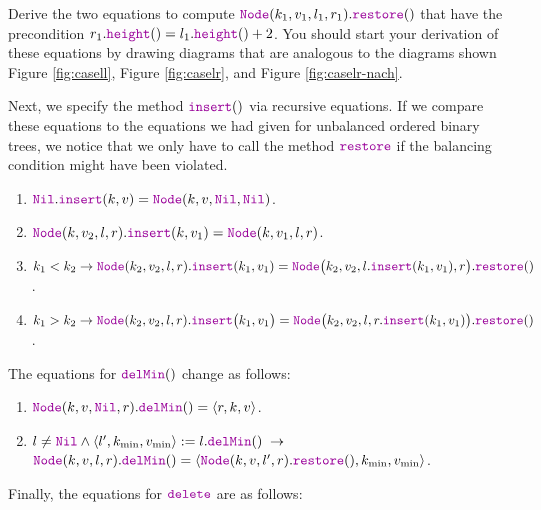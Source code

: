 \exercise
Derive the two equations to compute $\mytt{Node}(k_1,v_1,l_1,r_1).\mytt{restore}()$ that have the
precondition $r_1.\mytt{height}() = l_1.\mytt{height}() + 2$.  You should start your derivation of these
equations by drawing diagrams that are analogous to the diagrams shown Figure \ref{fig:casell}, Figure
\ref{fig:caselr}, and Figure \ref{fig:caselr-nach}. 
\eox

Next, we specify the method  $\mytt{insert}()$ via recursive equations.
If we compare these equations to the equations we had given for unbalanced ordered binary trees, we
notice that we only have to call the method $\mytt{restore}$ if the balancing condition might have
been violated.
\begin{enumerate}
\item $\mytt{Nil}.\mytt{insert}(k,v) = \mytt{Node}(k,v, \mytt{Nil}, \mytt{Nil})$.  
\item $\mytt{Node}(k, v_2, l, r).\mytt{insert}(k,v_1) = \mytt{Node}(k, v_1, l, r)$.
\item $k_1 < k_2 \rightarrow 
          \mytt{Node}(k_2, v_2, l, r).\mytt{insert}(k_1, v_1) =
          \mytt{Node}\bigl(k_2, v_2, l.\mytt{insert}(k_1,v_1), r\bigr).\mytt{restore}()$.
\item $k_1 > k_2 \rightarrow 
         \mytt{Node}(k_2, v_2, l, r).\mytt{insert}\bigl(k_1, v_1\bigr) = 
         \mytt{Node}\bigl(k_2, v_2, l, r.\mytt{insert}(k_1,v_1)\bigr).\mytt{restore}()$.
\end{enumerate}
The equations for  $\mytt{delMin}()$ change as follows:
\begin{enumerate}
\item $\mytt{Node}(k, v, \mytt{Nil}, r).\mytt{delMin}() = \langle r, k, v \rangle$.
\item $l\not= \mytt{Nil} \wedge \langle l',k_{\textrm{min}}, v_{\textrm{min}}\rangle := l.\mytt{delMin}() 
       \;\rightarrow$ \\[0.2cm]
       \hspace*{1.3cm} 
       $\mytt{Node}(k, v, l, r).\mytt{delMin}() = 
        \langle \mytt{Node}(k, v, l', r).\mytt{restore}(), k_{\textrm{min}}, v_{\textrm{min}} \rangle$.
\end{enumerate}
Finally, the equations for $\mytt{delete}$ are as follows:
